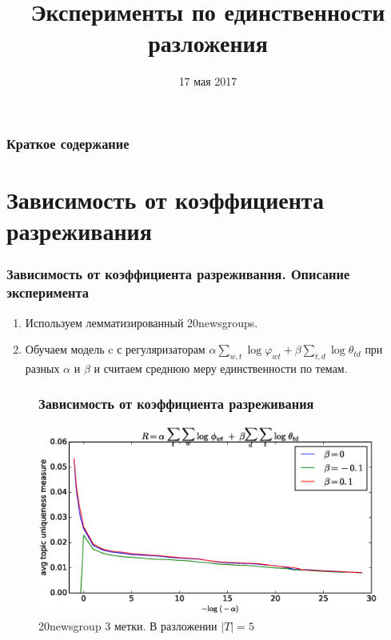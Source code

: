 \documentclass[utf8]{beamer}
\title{Эксперименты по единственности разложения}
\date{17 мая 2017}
\renewcommand{\phi}{\varphi}
\begin{document}
	\begin{frame}
		\titlepage
	\end{frame}

	\begin{frame}
		\frametitle{Краткое содержание}
		\renewcommand{\baselinestretch}{1.5}
		\fontsize{12pt}{9.2}\selectfont
		\tableofcontents
	\end{frame}
	
\section{Зависимость от коэффициента разреживания}
	\begin{frame}	
	\frametitle{Зависимость от коэффициента разреживания. Описание эксперимента}
	\begin{enumerate}
\item Используем лемматизированный 20newsgroups.
\item Обучаем модель c с регуляризаторам $\alpha \sum_{w, t} \log \phi_{wt} + \beta \sum_{t, d} \log \theta_{td}$ при разных $\alpha$ и $\beta$ и считаем  среднюю меру единственности по темам.
\end{enumerate}
	\end{frame}
	\begin{frame}	
	\begin{figure}[h]
	\frametitle{Зависимость от коэффициента разреживания}
	\centering  	
	\caption{20newsgroup 3 метки. В разложении $|T| = 5$} 
	\medskip
	\includegraphics[width=0.9\linewidth]{presentation_pictures/alpha_dependency_topics_origin_3_ums.eps}  
	\end{figure}
	\end{frame}
	
\end{document}
